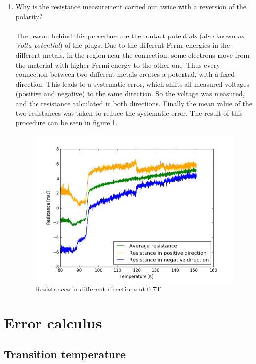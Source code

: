 \documentclass[a4paper,parskip,11pt, DIV12]{scrreprt}
\begin{document}
\begin{enumerate}
\item Why is the resistance measurement carried out twice with a reversion of the polarity?\\
\\
The reason behind this procedure are the contact potentials (also known as \emph{Volta potential}) of the plugs. Due to the different Fermi-energies in the different metals, in the region near the connection, some electrons move from the material with higher Fermi-energy to the other one. Thus every connection between two different metals creates a potential, with a fixed direction.  This leads to a systematic error, which shifts all measured voltages (positive and negative) to the same direction. So the voltage was measured, and the resistance calculated in both directions. Finally the mean value of the two resistances was taken to reduce the systematic error. The result of this procedure can be seen in figure \ref{widerstand07T}.
\begin{figure}[H]
\centering
\includegraphics[scale=0.45]{widerstand07T}
\caption[]{Resistances in different directions at 0.7T}
\label{widerstand07T}
\end{figure}

\end{enumerate}

\chapter{Error calculus}

\section{Transition temperature}
\end{document}
